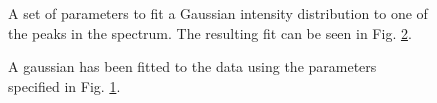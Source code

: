 \documentclass[11pt,a4paper]{article}
\begin{document}
\begin{figure}[h!]
  \centering
  \caption{A set of parameters to fit a Gaussian intensity distribution to 
	  one of the peaks in the spectrum. The resulting fit can be seen in Fig. 
  \ref{fig:fittedgaussian}.} \label{fig:fitpars}
\end{figure}

\begin{figure}[h!]
  \centering
  \caption{A gaussian has been fitted to the data using the parameters
  specified in Fig. \ref{fig:fitpars}.} \label{fig:fittedgaussian}
\end{figure}
\end{document}
